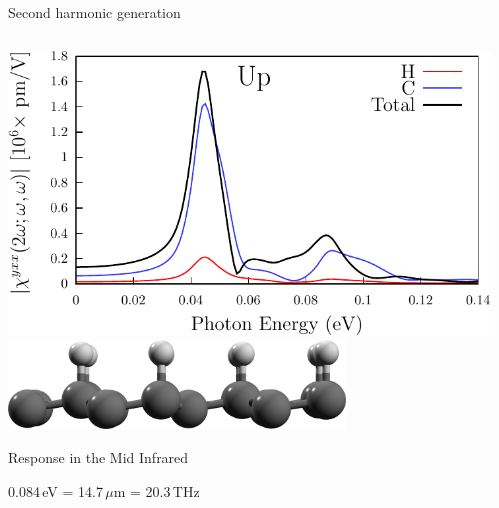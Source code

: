 \documentclass{beamer}
\begin{document}
\begin{frame}

\begin{center}
{\Large Second harmonic generation}
\end{center}

\begin{columns}

\begin{center}
\small 

\vspace{-1mm}
\includegraphics[width=1.0\textwidth]{figs/plots/shg-lay-up.pdf}
\vspace{6mm}
\includegraphics[width=0.7\textwidth]{figs/up2.png}

\vspace{7mm}
Response in the Mid Infrared

0.084\,eV = 14.7\,$\mu$m = 20.3\,THz

\end{center}


\begin{center}
\small


\end{center}
\end{columns}
\end{frame}
\end{document}
